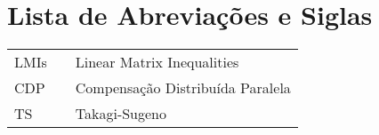 \chapter*{Lista de Abreviações e Siglas}

\vspace*{-0.5cm}

\onehalfspacing


\noindent
\begin{tabular}{l c p{.85\linewidth}}
LMIs              & & Linear Matrix Inequalities\\

CDP               & & Compensação Distribuída Paralela\\

TS                & & Takagi-Sugeno\\

\end{tabular}

%
 
